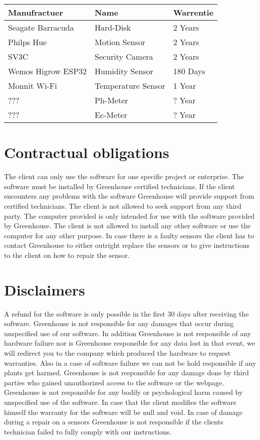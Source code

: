 \begin{table}
\begin{center}
\label{tab:Warrenties}
\begin{tabular}{| m{4cm} | m{4cm} | m{4cm} |}
\hline
\textbf{Manufractuer} & \textbf{Name} & \textbf{Warrentie} \\ \hline 
Seagate Barracuda & Hard-Disk & 2 Years \\ \hline 
Philps Hue & Motion Sensor & 2 Years \\ \hline 
SV3C & Security Camera & 2 Years \\ \hline 
Wemos Higrow ESP32 & Humidity Sensor & 180 Days \\ \hline
Monnit Wi-Fi & Temperature Sensor & 1 Year \\ \hline
??? & Ph-Meter & ? Year \\ \hline
??? & Ec-Meter & ? Year \\ 
\hline 
\end{tabular}
\end{center}
\end{table}


\section{Contractual obligations}
The client can only use the software for one specific project or enterprise. The
software must be installed by Greenhouse certified technicians. If the client
encounters any problems with the software Greenhouse will provide support from
certified technicians. The client is not allowed to seek support from any third
party. The computer provided is only intended for use with the software provided
by Greenhouse. The client is not allowed to install any other software or use
the computer for any other purpose. In case there is a faulty sensors the client
has to contact Greenhouse to either outright replace the sensors or to give
instructions to the client on how to repair the sensor.

\section{Disclaimers}
A refund for the software is only possible in the first 30 days after receiving
the software. Greenhouse is not responsible for any damages that occur during
unspecified use of our software. In addition Greenhouse is not responsible of
any hardware failure nor is Greenhouse responsible for any data lost in that
event, we will redirect you to the company which produced the hardware to
request warranties. Also in a case of software failure we can not be hold
responsible if any plants get harmed. Greenhouse is not responsible for any
damage done by third parties who gained unauthorized access to the software or
the webpage. Greenhouse is not responsible for any bodily or psychological harm
caused by unspecified use of the software. In case that the client modifies the
software himself the warranty for the software will be null and void. In case of
damage during a repair on a sensors Greenhouse is not responsible if the clients
technician failed to fully comply with our instructions.

